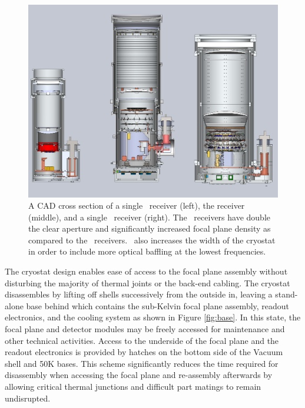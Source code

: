 \documentclass[]{spie}  %
\begin{document}
\begin{figure} [hb]
	\begin{center}
		\includegraphics[scale=0.35]{BA_B3_spud.PDF}
	\end{center}
	\caption{A CAD cross section of a single \keckarray\ receiver (left), the
	 receiver (middle), and a single
	\biceparray\ receiver (right). The \biceparray\ receivers have double
	the clear aperture and significantly increased focal plane density as
	compared to the \keckarray\ receivers. \biceparray\ also increases the
	width of the cryostat in order to include more optical baffling at the
	lowest frequencies.}
	\label{fig:bavskeck}
\end{figure}







The cryostat design enables ease of access to the focal plane assembly without
disturbing the majority of thermal joints or the back-end cabling. The
cryostat disassembles by lifting off shells successively
from the outside in, leaving a stand-alone base behind which contains the
sub-Kelvin focal plane assembly, readout electronics, and the cooling system as shown in Figure
\ref{fig:base}. In this state, the focal plane and detector modules may be
freely accessed for maintenance and other technical activities. Access to the
underside of the focal plane and the readout electronics is provided by
hatches on the bottom side of the Vacuum shell and 50K bases. This scheme
significantly reduces the time required for disassembly when accessing the
focal plane and re-assembly afterwards by allowing critical thermal junctions
and difficult part matings to remain undisrupted.
\end{document}
